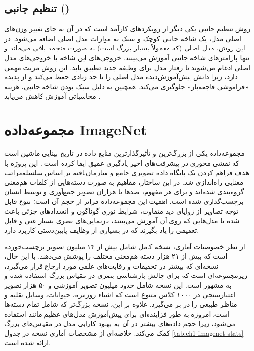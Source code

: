 \subsection{تنظیم جانبی ()}
روش تنظیم جانبی یکی دیگر از رویکردهای کارآمد است که در آن به جای تغییر وزن‌های اصلی مدل، یک شاخه جانبی کوچک و سبک به موازات مدل اصلی اضافه می‌شود. در این روش، مدل اصلی (که معمولاً بسیار بزرگ است) به صورت منجمد باقی می‌ماند و تنها پارامترهای شاخه جانبی آموزش می‌بینند. خروجی‌های این شاخه با خروجی‌های مدل اصلی ادغام می‌شوند تا رفتار مدل برای وظیفه جدید تطبیق یابد. این روش مزیت مهمی دارد، زیرا دانش پیش‌آموزش‌دیده مدل اصلی را تا حد زیادی حفظ می‌کند و از پدیده «فراموشی فاجعه‌بار» جلوگیری می‌کند. همچنین به دلیل سبک بودن شاخه جانبی، هزینه محاسباتی آموزش کاهش می‌یابد \cite{8409325,5294562}.

\section{مجموعه‌داده ImageNet}
\label{sec:ch1-imagenet}
مجموعه‌داده  یکی از بزرگ‌ترین و تأثیرگذارترین منابع داده در تاریخ بینایی ماشین است که نقشی محوری در پیشرفت‌های اخیر یادگیری عمیق ایفا کرده است \cite{5206848}. این پروژه با هدف فراهم کردن یک پایگاه داده تصویری جامع و سازمان‌یافته بر اساس سلسله‌مراتب معنایی  راه‌اندازی شد. در این ساختار، مفاهیم به صورت دسته‌هایی از کلمات هم‌معنی گروه‌بندی شده‌اند و برای هر مفهوم، صدها یا هزاران تصویر جمع‌آوری و توسط انسان برچسب‌گذاری شده است. اهمیت این مجموعه‌داده فراتر از حجم آن است؛ تنوع قابل توجه تصاویر از زوایای دید متفاوت، شرایط نوری گوناگون و انسدادهای جزئی باعث شده تا مدل‌هایی که روی آن آموزش می‌بینند، بازنمایی‌های بصری بسیار غنی و قابل تعمیمی را یاد بگیرند که در بسیاری از وظایف پایین‌دستی کاربرد دارد.

از نظر خصوصیات آماری، نسخه کامل  شامل بیش از ۱۴ میلیون تصویر برچسب‌خورده است که بیش از ۲۱ هزار دسته هم‌معنی مختلف را پوشش می‌دهند. با این حال، نسخه‌ای که بیشتر در تحقیقات و رقابت‌های علمی مورد ارجاع قرار می‌گیرد، زیرمجموعه‌ای است که برای چالش بازشناسی بصری در مقیاس بزرگ استفاده شده و به  مشهور است. این نسخه شامل حدود  میلیون تصویر آموزشی و ۵۰ هزار تصویر اعتبارسنجی در ۱۰۰۰ کلاس متنوع است که اشیاء روزمره، حیوانات، وسایل نقلیه و مناظر طبیعی را در بر می‌گیرد. علاوه بر این، نسخه بزرگ‌تر  که شامل تمام دسته‌ها است، امروزه به طور فزاینده‌ای برای پیش‌آموزش مدل‌های عظیم مانند  استفاده می‌شود، زیرا حجم داده‌های بیشتر در آن به بهبود کارایی مدل در مقیاس‌های بزرگ کمک می‌کند. خلاصه‌ای از مشخصات آماری نسخه  در جدول \ref{tab:ch1-imagenet-stats} ارائه شده است.

